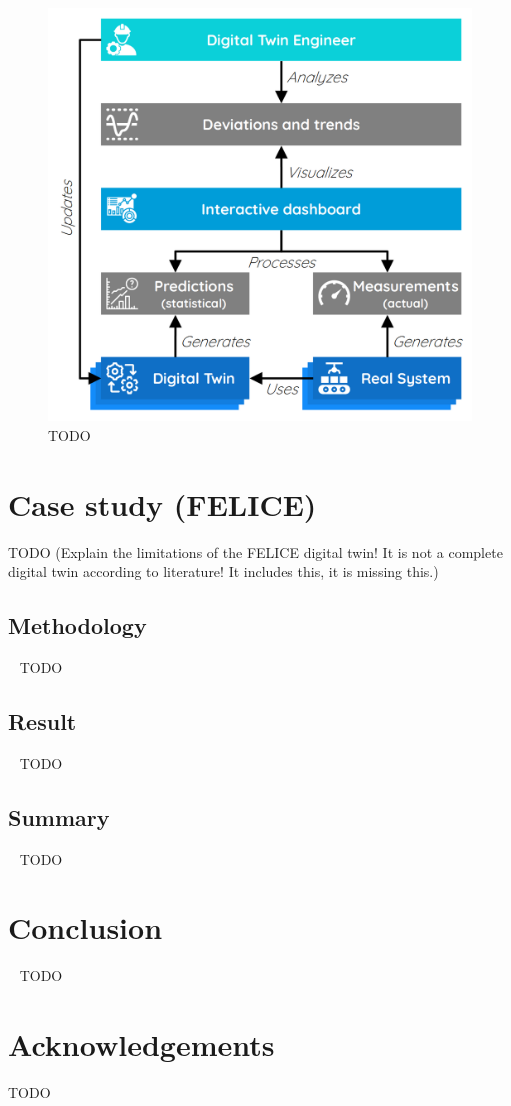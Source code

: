 \documentclass[9pt,conference]{IEEEtran}
\begin{document}
    \begin{figure}[htbp]
        \includegraphics[width=\columnwidth]{Continuous Quality Control.png}
        \caption{TODO}
        \label{todo-3}
    \end{figure}

    \section{Case study (FELICE)}
    \label{section:case}
    TODO (Explain the limitations of the FELICE digital twin! It is not a complete digital twin according to literature! It includes this, it is missing this.)

    \subsection{Methodology}~\label{section:case_methodology}
    TODO

    \subsection{Result}~\label{section:case_result}
    TODO

    \subsection{Summary}~\label{section:case_summary}
    TODO

    \section{Conclusion}~\label{section:conclusion}
    TODO

    \section*{Acknowledgements}
    TODO

    
    
\end{document}
